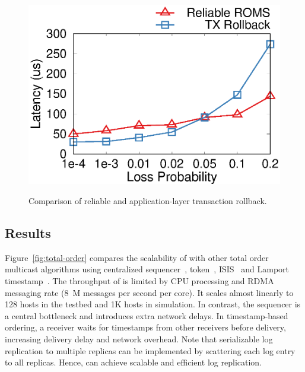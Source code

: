 \begin{figure}[t!]
\begin{minipage}{.31\textwidth}
		{\includegraphics[width=\textwidth]{gnuplot/loss_latency.eps}}
		\caption{Comparison of reliable \sys and application-layer transaction rollback.}
		\label{fig:ycsb-loss}
	\end{minipage}
\vspace{-15pt}
\end{figure}

\subsection{Results}
\label{subsubsec:scalability}
Figure~\ref{fig:total-order} compares the scalability of \sys with other total order multicast algorithms using centralized sequencer~\cite{eris,kaminsky2016design}, token~\cite{rajagopalan1989token}, ISIS~\cite{birman1985replication} and Lamport timestamp~\cite{lamport1978time}. The throughput of \sys is limited by CPU processing and RDMA messaging rate (8~M messages per second per core).
It scales almost linearly to 128 hosts in the testbed and 1K hosts in simulation. In contrast, the sequencer is a central bottleneck and introduces extra network delays. In timestamp-based ordering, a receiver waits for timestamps from other receivers before delivery, increasing delivery delay and network overhead. Note that serializable log replication to multiple replicas can be implemented by scattering each log entry to all replicas. Hence, \sys can achieve scalable and efficient log replication.







